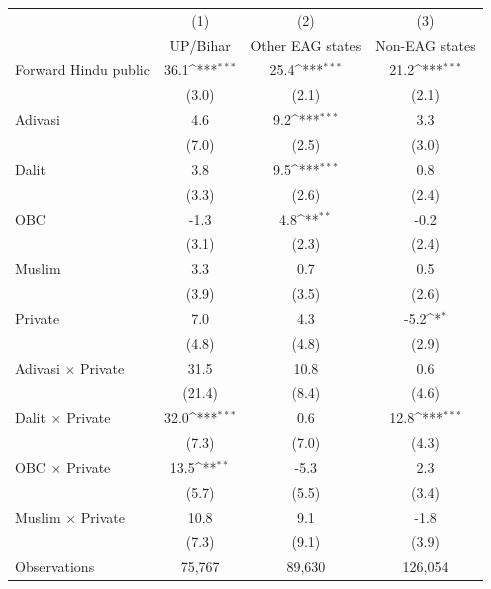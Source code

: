 {
\def\sym#1{\ifmmode^{#1}\else\(^{#1}\)\fi}
\begin{tabular}{l*{3}{c}}
\toprule
                    &\multicolumn{1}{c}{(1)}&\multicolumn{1}{c}{(2)}&\multicolumn{1}{c}{(3)}\\
                    &\multicolumn{1}{c}{UP/Bihar}&\multicolumn{1}{c}{Other EAG states}&\multicolumn{1}{c}{Non-EAG states}\\
\midrule
Forward Hindu public&        36.1\sym{***}&        25.4\sym{***}&        21.2\sym{***}\\
                    &       (3.0)         &       (2.1)         &       (2.1)         \\
\addlinespace
Adivasi             &         4.6         &         9.2\sym{***}&         3.3         \\
                    &       (7.0)         &       (2.5)         &       (3.0)         \\
\addlinespace
Dalit               &         3.8         &         9.5\sym{***}&         0.8         \\
                    &       (3.3)         &       (2.6)         &       (2.4)         \\
\addlinespace
OBC                 &        -1.3         &         4.8\sym{**} &        -0.2         \\
                    &       (3.1)         &       (2.3)         &       (2.4)         \\
\addlinespace
Muslim              &         3.3         &         0.7         &         0.5         \\
                    &       (3.9)         &       (3.5)         &       (2.6)         \\
\addlinespace
Private             &         7.0         &         4.3         &        -5.2\sym{*}  \\
                    &       (4.8)         &       (4.8)         &       (2.9)         \\
\addlinespace
Adivasi $\times$ Private&        31.5         &        10.8         &         0.6         \\
                    &      (21.4)         &       (8.4)         &       (4.6)         \\
\addlinespace
Dalit $\times$ Private&        32.0\sym{***}&         0.6         &        12.8\sym{***}\\
                    &       (7.3)         &       (7.0)         &       (4.3)         \\
\addlinespace
OBC $\times$ Private&        13.5\sym{**} &        -5.3         &         2.3         \\
                    &       (5.7)         &       (5.5)         &       (3.4)         \\
\addlinespace
Muslim $\times$ Private&        10.8         &         9.1         &        -1.8         \\
                    &       (7.3)         &       (9.1)         &       (3.9)         \\
\midrule
Observations        &      75,767         &      89,630         &     126,054         \\
\bottomrule
\end{tabular}
}
